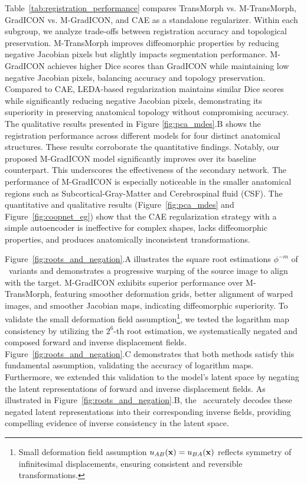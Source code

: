 Table~\ref{tab:registration_performance} compares TransMorph vs. M-TransMorph, GradICON vs. M-GradICON, and CAE as a standalone regularizer. Within each subgroup, we analyze trade-offs between registration accuracy and topological preservation. M-TransMorph improves diffeomorphic properties by reducing negative Jacobian pixels but slightly impacts segmentation performance. M-GradICON achieves higher Dice scores than GradICON while maintaining low negative Jacobian pixels, balancing accuracy and topology preservation. Compared to CAE, LEDA-based regularization maintains similar Dice scores while significantly reducing negative Jacobian pixels, demonstrating its superiority in preserving anatomical topology without compromising accuracy.
%
The qualitative results presented in Figure \ref{fig:pca_mdes}.B shows the registration performance across different models for four distinct anatomical structures. These results corroborate the quantitative findings. Notably, our proposed M-GradICON model significantly improves over its baseline counterpart. This underscores the effectiveness of the secondary network. The performance of M-GradICON is especially noticeable in the smaller anatomical regions such as Subcortical-Gray-Matter and Cerebrospinal fluid (CSF). The quantitative and qualitative results (Figure~\ref{fig:pca_mdes} and Figure~\ref{fig:coopnet_eg}) show that the CAE regularization strategy with a simple autoencoder is ineffective for complex shapes, lacks diffeomorphic properties, and produces anatomically inconsistent transformations.  

Figure~\ref{fig:roots_and_negation}.A illustrates the square root estimations \(\phi^{-m}\) of \model~variants and demonstrates a progressive warping of the source image to align with the target. M-GradICON exhibits superior performance over M-TransMorph, featuring smoother deformation grids, better alignment of warped images, and smoother Jacobian maps, indicating diffeomorphic superiority. To validate the small deformation field assumption\footnote{Small deformation field assumption \(u_{AB}(\mathbf{x}) = u_{BA}(\mathbf{x})\) reflects symmetry of infinitesimal displacements, ensuring consistent and reversible transformations.}, we tested the logarithm map consistency by utilizing the $2^6$-th root estimation, we systematically negated and composed forward and inverse displacement fields. Figure~\ref{fig:roots_and_negation}.C demonstrates that both methods satisfy this fundamental assumption, validating the accuracy of logarithm maps. Furthermore, we extended this validation to the model's latent space by negating the latent representations of forward and inverse displacement fields. As illustrated in Figure~\ref{fig:roots_and_negation}.B, the \model~accurately decodes these negated latent representations into their corresponding inverse fields, providing compelling evidence of inverse consistency in the latent space. 

